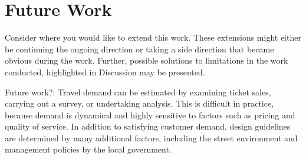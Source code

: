 \section{Future Work}

Consider where you would like to extend this work. These extensions might either be continuing the ongoing direction or taking a side direction that became obvious during the work. Further, possible solutions to limitations in the work conducted, highlighted in Discussion may be presented.

Future work?: Travel demand can be estimated by examining ticket sales, carrying out a survey, or undertaking analysis. This is difficult in practice, because demand is dynamical and highly sensitive to factors such as pricing and quality of service. In addition to satisfying customer demand, design guidelines are determined by many additional factors, including the street environment and management policies by the local government\citep{fan09}.